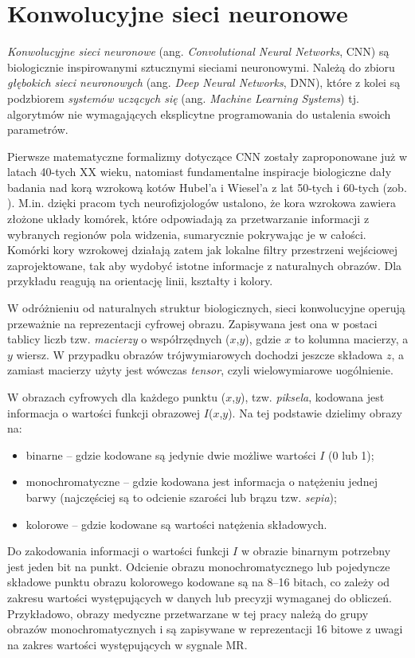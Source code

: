 \chapter{Konwolucyjne sieci neuronowe}
\textit{Konwolucyjne sieci neuronowe} (ang. \textit{Convolutional Neural Networks}, CNN) są biologicznie inspirowanymi sztucznymi sieciami neuronowymi. Należą do zbioru \textit{głębokich sieci neuronowych} (ang. \textit{Deep Neural Networks}, DNN), które z kolei są podzbiorem \textit{systemów uczących się} (ang. \textit{Machine Learning Systems}) tj. algorytmów nie wymagających eksplicytne programowania do ustalenia swoich parametrów.

Pierwsze matematyczne formalizmy dotyczące CNN zostały zaproponowane już w latach 40-tych XX wieku, natomiast fundamentalne inspiracje biologiczne dały badania nad korą wzrokową kotów Hubel'a i Wiesel’a z lat 50-tych i 60-tych (zob. \cite{Wurtz2009}). M.in. dzięki pracom tych neurofizjologów ustalono, że kora wzrokowa zawiera złożone układy komórek, które odpowiadają za przetwarzanie informacji z wybranych regionów pola widzenia, sumarycznie pokrywając je w całości. Komórki kory wzrokowej działają zatem jak lokalne filtry przestrzeni wejściowej zaprojektowane, tak aby wydobyć istotne informacje z naturalnych obrazów. Dla przykładu reagują na orientację linii, kształty i kolory.

W odróżnieniu od naturalnych struktur biologicznych, sieci konwolucyjne operują przeważnie na reprezentacji cyfrowej obrazu. Zapisywana jest ona w postaci tablicy liczb tzw. \textit{macierzy} o współrzędnych ($x$,$y$), gdzie $x$ to kolumna macierzy, a $y$ wiersz. W przypadku obrazów trójwymiarowych dochodzi jeszcze składowa $z$, a zamiast macierzy użyty jest wówczas \textit{tensor}, czyli wielowymiarowe uogólnienie.

W obrazach cyfrowych dla każdego punktu ($x$,$y$), tzw. \textit{piksela}, kodowana jest informacja o wartości funkcji obrazowej $I$($x$,$y$). Na tej podstawie dzielimy obrazy na:
\begin{itemize}
	\item binarne – gdzie kodowane są jedynie dwie możliwe wartości $I$ (0 lub 1);
	\item monochromatyczne – gdzie kodowana jest informacja o natężeniu jednej barwy (najczęściej są to odcienie szarości lub brązu tzw. \textit{sepia});
	\item kolorowe – gdzie kodowane są wartości natężenia składowych.
\end{itemize}
Do zakodowania informacji o wartości funkcji $I$ w obrazie binarnym potrzebny jest jeden bit na punkt. Odcienie obrazu monochromatycznego lub pojedyncze składowe punktu obrazu kolorowego kodowane są na 8–16 bitach, co zależy od zakresu wartości występujących w danych lub precyzji wymaganej do obliczeń. Przykładowo, obrazy medyczne przetwarzane w tej pracy należą do grupy obrazów monochromatycznych i są zapisywane w reprezentacji 16 bitowe z uwagi na zakres wartości występujących w sygnale MR.

